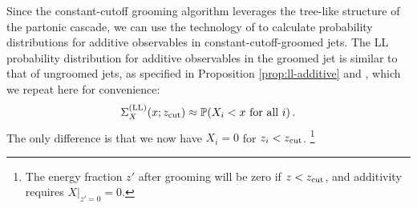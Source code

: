 

Since the \gls{constant-cutoff} grooming algorithm leverages the tree-like structure of the partonic cascade, we can use the technology of  to calculate probability distributions for additive observables in constant-cutoff-groomed jets.
%
The LL probability distribution for additive observables in the groomed jet is similar to that of ungroomed jets, as specified in Proposition \ref{prop:ll-additive} and , which we repeat here for convenience:
\begin{align}
    \label{eq:ll-groomed-additive}
    \Sigma^{\text{(LL)}}_X(x; \zcut) \approx \mathbb{P}(X_i < x \text{ for all } i)
    \,.
\end{align}
%
The only difference is that we now have \(X_i = 0\) for \(z_i < z_{\rm cut}\).%
\footnote{
    The energy fraction \(z'\) after grooming will be zero if \(z < z_{\rm cut}\), and additivity requires \(X \big|_{z' = 0} = 0\).
}


